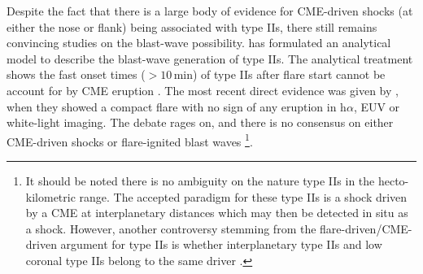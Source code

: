 Despite the fact that there is a large body of evidence for CME-driven shocks (at either the nose or flank) being associated with type IIs, there still remains convincing studies on the blast-wave possibility. \citet{vrsnak2000a,vrsnak2000b} has formulated an analytical model to describe the blast-wave generation of type IIs. The analytical treatment shows the fast onset times ($>10$\,min) of type IIs after flare start cannot be account for by CME eruption \citep{vrsnak2001}. The most recent direct evidence was given by \citep{mag2012}, when they showed a compact flare with no sign of any eruption in h$\alpha$, EUV or white-light imaging. The debate rages on, and there is no consensus on either CME-driven shocks or flare-ignited blast waves \citep{vrsnak2008} \footnote{It should be noted there is no ambiguity on the nature type IIs in the hecto-kilometric range. The accepted paradigm for these type IIs is a shock driven by a CME at interplanetary distances which may then be detected in situ as a shock. However, another controversy stemming from the flare-driven/CME-driven argument for type IIs is whether interplanetary type IIs and low coronal type IIs belong to the same driver \citep{cane2005}.}.



